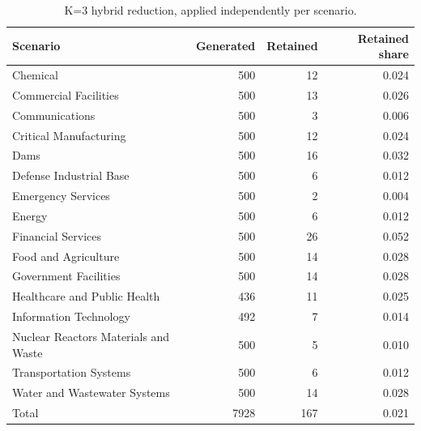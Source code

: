 \begin{table}[tb]
\centering
\caption{K=3 hybrid reduction, applied independently per scenario.}
\label{tab:corrected_k03_reduction}
\begin{tabular}{lrrr}
\toprule
Scenario & Generated & Retained & Retained share \\
\midrule
Chemical & 500 & 12 & 0.024 \\
Commercial Facilities & 500 & 13 & 0.026 \\
Communications & 500 & 3 & 0.006 \\
Critical Manufacturing & 500 & 12 & 0.024 \\
Dams & 500 & 16 & 0.032 \\
Defense Industrial Base & 500 & 6 & 0.012 \\
Emergency Services & 500 & 2 & 0.004 \\
Energy & 500 & 6 & 0.012 \\
Financial Services & 500 & 26 & 0.052 \\
Food and Agriculture & 500 & 14 & 0.028 \\
Government Facilities & 500 & 14 & 0.028 \\
Healthcare and Public Health & 436 & 11 & 0.025 \\
Information Technology & 492 & 7 & 0.014 \\
Nuclear Reactors Materials and Waste & 500 & 5 & 0.010 \\
Transportation Systems & 500 & 6 & 0.012 \\
Water and Wastewater Systems & 500 & 14 & 0.028 \\
Total & 7928 & 167 & 0.021 \\
\bottomrule
\end{tabular}
\end{table}

